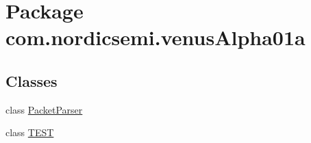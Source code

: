 \hypertarget{namespacecom_1_1nordicsemi_1_1venus_alpha01a}{}\section{Package com.\+nordicsemi.\+venus\+Alpha01a}
\label{namespacecom_1_1nordicsemi_1_1venus_alpha01a}
\subsection*{Classes}
\begin{DoxyCompactItemize}
\item 
class \hyperlink{classcom_1_1nordicsemi_1_1venus_alpha01a_1_1_packet_parser}{Packet\+Parser}
\item 
class \hyperlink{classcom_1_1nordicsemi_1_1venus_alpha01a_1_1_t_e_s_t}{T\+E\+ST}
\end{DoxyCompactItemize}
